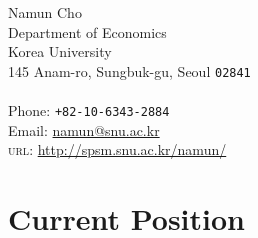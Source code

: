 \documentclass[11pt, a4paper]{article} %
\begin{document}

{\LARGE Namun Cho}\\[1cm] %
Department of Economics\\ %
Korea University\\
145 Anam-ro, Sungbuk-gu, Seoul \texttt{02841}\\
\\[.2cm]
Phone: \texttt{+82-10-6343-2884}\\ %
Email: \href{mailto:namun@snu.ac.kr}{namun@snu.ac.kr}\\ %
\textsc{url}: \href{http://spsm.snu.ac.kr/namun/}{http://spsm.snu.ac.kr/namun/}\\ %






\section*{Current Position}
\end{document}
